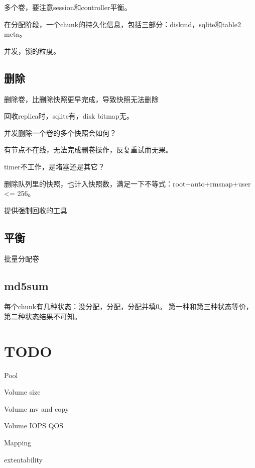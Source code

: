 多个卷，要注意session和controller平衡。

在分配阶段，一个chunk的持久化信息，包括三部分：diskmd，sqlite和table2 meta。

并发，锁的粒度。

\subsection{删除}

删除卷，比删除快照更早完成，导致快照无法删除

回收replica时，sqlite有，disk bitmap无。

并发删除一个卷的多个快照会如何？

有节点不在线，无法完成删卷操作，反复重试而无果。

timer不工作，是堵塞还是其它？

删除队列里的快照，也计入快照数，满足一下不等式：root+auto+rmsnap+user <= 256。

提供强制回收的工具

\subsection{平衡}

批量分配卷

\subsection{md5sum}

每个chunk有几种状态：没分配，分配，分配并填0。
第一种和第三种状态等价，第二种状态结果不可知。

\section{TODO}

\begin{enumbox}
\item Pool
\item Volume size
\item Volume mv and copy
\item Volume IOPS QOS
\item Mapping
\item extentability
\end{enumbox}

